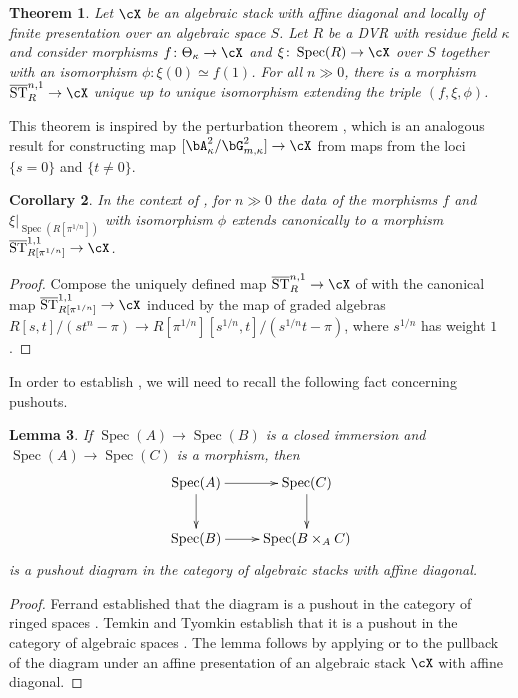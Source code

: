 \documentclass[a4paper]{amsart}
\numberwithin{equation}{section}
\theoremstyle{plain}
\newtheorem{thm}{Theorem}[section]
\newtheorem{cor}[thm]{Corollary}
\newtheorem{lem}[thm]{Lemma}
\theoremstyle{definition}
\DeclareMathOperator{\Spec}{Spec}
\DeclareMathOperator{\ST}{ST}
\newcommand{\co}{\colon}
\def\oST{\overline{\ST}}
\begin{document}
\begin{thm} \label{T:strange-gluing}
Let $\cX$ be an algebraic stack with affine diagonal and locally of finite presentation over an algebraic space $S$. Let $R$ be a DVR with residue field $\kappa$ and consider morphisms $f \co \Theta_\kappa \to \cX$ and $\xi \co \Spec(R) \to \cX$ over $S$ together with an isomorphism $\phi \co \xi(0) \simeq f(1)$. For all $n\gg 0$, there is a morphism $\oST^{n,1}_R \to \cX$ unique up to unique isomorphism extending the triple $(f, \xi, \phi)$. 
\end{thm}


This theorem is inspired by the perturbation theorem \cite[Thm.~3.5.3]{hlinstability}, which is an analogous result for constructing map $[\bA^2_\kappa/\bG_{m,\kappa}^2] \to \cX$ from maps from the loci $\{s=0\}$ and $\{t\neq 0\}$. 

\begin{cor} \label{C:strange_gluing}
In the context of , for $n\gg 0$ the data of the morphisms $f$ and $\xi|_{\Spec(R[\pi^{1/n}])}$ with isomorphism $\phi$ extends canonically to a morphism $\oST^{1,1}_{R[\pi^{1/n}]} \to \cX$.
\end{cor}
\begin{proof}
Compose the uniquely defined map $\oST^{n,1}_R \to \cX$ of  with the canonical map $\oST^{1,1}_{R[\pi^{1/n}]} \to \cX$ induced by the map of graded algebras $R[s,t]/(st^n-\pi) \to R[\pi^{1/n}][s^{1/n},t]/(s^{1/n}t-\pi)$, where $s^{1/n}$ has weight $1$.
\end{proof}

In order to establish , we will need to recall the following fact concerning pushouts.

\begin{lem} \label{L:pushout1}
If $\Spec(A) \to \Spec(B)$ is a closed immersion and $\Spec(A) \to \Spec(C)$ is a morphism, then
$$\xymatrix{
\Spec(A) \ar[d] \ar[r]		& \Spec(C) \ar[d] \\
\Spec(B) \ar[r]			& \Spec(B \times_{A} C)
}$$
is a pushout diagram in the category of algebraic stacks with affine diagonal.
\end{lem}

\begin{proof}
Ferrand established that the diagram is a pushout in the category of ringed spaces \cite[Thm. 5.1]{ferrand}. Temkin and Tyomkin establish that it is a pushout in the category of algebraic spaces \cite[Thm. 4.5]{temkin-tyomkin}.  The lemma follows by applying \cite[Thm 4.7]{temkin-tyomkin} or \cite[Lem. A.4]{hall-coherent} to the pullback of the diagram under an affine presentation of an algebraic stack $\cX$ with affine diagonal.
\end{proof}
\end{document}
